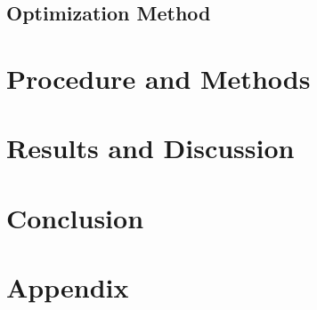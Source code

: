 \documentclass[a4paper,12pt]{report}
\begin{document}
\subsection{Optimization Method}


\section{Procedure and Methods}


\section{Results and Discussion}


\section{Conclusion}


\section{Appendix}
\end{document}
